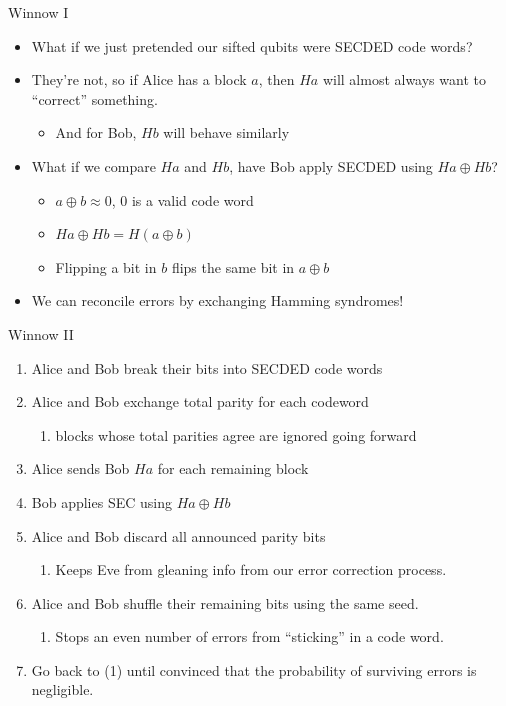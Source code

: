 \documentclass[pdf]{beamer}
\begin{document}
\begin{frame}{Winnow I}
  \begin{itemize}
  \item What if we just pretended our sifted qubits were SECDED code words?
  \pause\item They're not, so if Alice has a block $a$, then $Ha$ will almost always
    want to ``correct'' something.
    \begin{itemize}
    \item And for Bob, $Hb$ will behave similarly
    \end{itemize}
  \pause\item What if we compare $Ha$ and $Hb$, have Bob apply SECDED using
    $Ha \oplus Hb$?
    \begin{itemize}
    \item $a \oplus b \approx 0$, 0 is a valid code word
    \item $Ha \oplus Hb = H(a \oplus b)$
    \item Flipping a bit in $b$ flips the same bit in $a \oplus b$
    \end{itemize}
  \pause\item We can reconcile errors by exchanging Hamming syndromes!
  \end{itemize}
\end{frame}
\begin{frame}{Winnow II}
  \begin{enumerate}
  \item Alice and Bob break their bits into SECDED code words
  \pause\item Alice and Bob exchange total parity for each codeword
    \begin{enumerate}
    \item blocks whose total parities agree are ignored going forward
    \end{enumerate}
  \pause\item Alice sends Bob $Ha$ for each remaining block
  \pause\item Bob applies SEC using $Ha \oplus Hb$
  \pause\item Alice and Bob discard all announced parity bits
    \begin{enumerate}
    \item Keeps Eve from gleaning info from our error correction process.
    \end{enumerate}
  \pause\item Alice and Bob shuffle their remaining bits using the same seed.
    \begin{enumerate}
    \item Stops an even number of errors from ``sticking'' in a code word.
    \end{enumerate}
  \pause\item Go back to (1) until convinced that the probability of surviving errors
    is negligible.
  \end{enumerate}
\end{frame}
\end{document}

